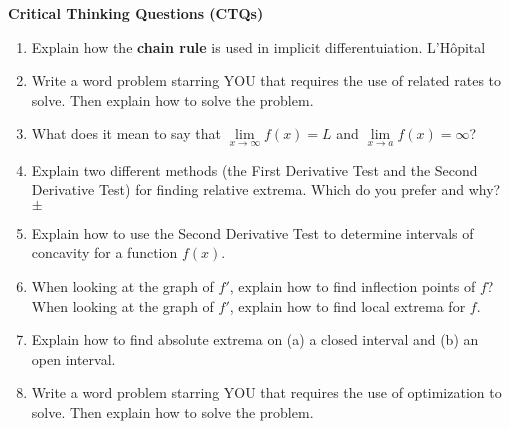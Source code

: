 \documentclass[12pt]{article}
\begin{document}
\textbf{Critical Thinking Questions (CTQs)}

\begin{enumerate}
\setlength\itemsep{1em}
\item Explain how the \textbf{chain rule} is used in implicit differentuiation.  L'H\^{o}pital
\item Write a word problem starring YOU that requires the use of related rates to solve. Then explain how to solve the problem. 
\item What does it mean to say that $\lim\limits_{x \to \infty}f(x)=L$ and $\lim\limits_{x \to a}f(x)=\infty$?
\item Explain two different methods (the First Derivative Test and the Second Derivative Test) for finding relative extrema. Which do you prefer and why? $\pm$
\item Explain how to use the Second Derivative Test to determine intervals of concavity for a function $f(x)$.
\item When looking at the graph of $f'$, explain how to find inflection points of $f$? When looking at the graph of $f'$, explain how to find local extrema for $f$.
\item Explain how to find absolute extrema on (a) a closed interval and (b) an open interval.
\item Write a word problem starring YOU that requires the use of optimization to solve. Then explain how to solve the problem.

\end{enumerate}
\end{document}
